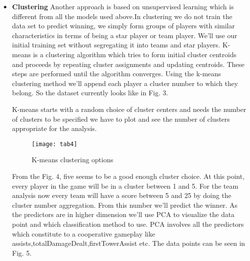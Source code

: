 \documentclass[conference]{IEEEtran}
\begin{document}
\begin{itemize}
  \item \textbf{Clustering}
Another approach is based on unsupervised learning which is different from all the models used above.In clustering we do not train the data set to predict winning, we simply form groups of players with similar characteristics in terms of being a star player or team player. We’ll use our initial training set without segregating it into teams and star players. K-means is a clustering algorithm which tries to form initial cluster centroids and proceeds by repeating cluster assignments and updating centroids. These steps are performed until the algorithm converges. Using the k-means clustering method we’ll append each player a cluster number to which they belong. 
So the dataset currently looks like in Fig. 3.




 K-means starts with a random choice of cluster centers and needs the number of clusters to be specified we have to plot and see the number of clusters appropriate for the analysis.

\begin{figure}[!t]
\texttt{[image: tab4]}
\caption{K-means clustering options}
\end{figure}

 From the Fig. 4, five seems to be a good enough cluster choice. At this point, every player in the game will be in a cluster between 1 and 5. For the team analysis now every team will have a score between 5 and 25 by doing the cluster number aggregation. From this number we’ll predict the winner. As the predictors are in higher dimension we’ll use PCA to visualize the data point and which classification method to use. PCA involves all the predictors which constitute to a cooperative gameplay like assists,totalDamageDealt,firstTowerAssist etc. The data points can be seen in Fig. 5.


\end{itemize}
\end{document}
